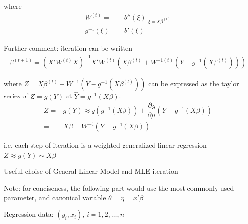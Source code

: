     where 
\begin{align}
    W^{(t)}=&\left.b''(\xi )\right|_{\xi =X\beta ^{(t)}}\\
    g^{-1}(\xi )=&b'(\xi )
\end{align}
    
    Further comment: iteration can be written
    \begin{align}
        \beta ^{(t+1)}=(X'W^{(t)}X)^{-1}X'W^{(t)}\left( X\beta ^{(t)}+W^{-1(t)}(Y-g^{-1}(X\beta ^{(t)})) \right) 
    \end{align}
    
    where $ Z= X\beta ^{(t)}+W^{-1}(Y-g^{-1}(X\beta ^{(t)})) $ can be expressed as the taylor series of $ Z=g(Y) $ at $ \hat{Y}=g^{-1}(X\beta ) $:
\begin{align}
    Z=&g(Y)\approx g(g^{-1}(X\beta ))+\dfrac{\partial^{} g}{\partial \mu  ^{}}(Y-g^{-1}(X\beta ))\\
    =& X\beta + W^{-1}(Y-g^{-1}(X\beta ))
\end{align}

    i.e. each step of iteration is a weighted generalized linear regression $ Z\approx g(Y)\sim X\beta  $

\begin{point}
    Useful choise of General Linear Model and MLE iteration
\end{point}

    Note: for conciseness, the following part would use the most commonly used parameter, and canonical variable $ \theta =\eta=x'\beta  $

    Regression data: $ (y_i,x_i) $, $ i=1,2,\ldots,n $

